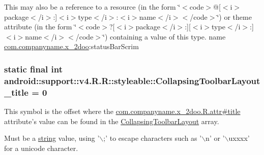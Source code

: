 This may also be a reference to a resource (in the form \char`\"{}$<$code$>$@\mbox{[}$<$i$>$package$<$/i$>$:\mbox{]}$<$i$>$type$<$/i$>$:$<$i$>$name$<$/i$>$$<$/code$>$\char`\"{}) or theme attribute (in the form \char`\"{}$<$code$>$?\mbox{[}$<$i$>$package$<$/i$>$:\mbox{]}\mbox{[}$<$i$>$type$<$/i$>$:\mbox{]}$<$i$>$name$<$/i$>$$<$/code$>$\char`\"{}) containing a value of this type.  name \hyperlink{namespacecom_1_1companyname_1_1x__2doo}{com.companyname.x\_\-2doo}:statusBarScrim \hypertarget{classandroid_1_1support_1_1v4_1_1_r_1_1styleable_496e34c231a07ed97f239394f3eda86e}{
\subsubsection[{CollapsingToolbarLayout\_\-title}]{\setlength{\rightskip}{0pt plus 5cm}static final int android::support::v4.R.R::styleable::CollapsingToolbarLayout\_\-title = 0}}
\label{classandroid_1_1support_1_1v4_1_1_r_1_1styleable_496e34c231a07ed97f239394f3eda86e}


This symbol is the offset where the \hyperlink{classcom_1_1companyname_1_1x__2doo_1_1_r_1_1attr_d23b9d3aaa28f1e83be97e20f187059b}{com.companyname.x\_\-2doo.R.attr\#title} attribute's value can be found in the \hyperlink{classandroid_1_1support_1_1v4_1_1_r_1_1styleable_aa101903fcf4b45a3b7fee0a0abc5ea8}{CollapsingToolbarLayout} array.

Must be a \hyperlink{classandroid_1_1support_1_1v4_1_1_r_1_1string}{string} value, using '$\backslash$;' to escape characters such as '$\backslash$n' or '$\backslash$uxxxx' for a unicode character. 

